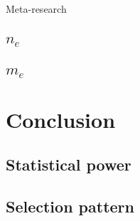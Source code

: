 \documentclass[]{book}
\begin{document}
Meta-research

\hypertarget{n_e}{%
\section{\texorpdfstring{\(n_e\)}{n\_e}}\label{n_e}}

\hypertarget{m_e}{%
\section{\texorpdfstring{\(m_e\)}{m\_e}}\label{m_e}}

\hypertarget{conclusion}{%
\chapter{Conclusion}\label{conclusion}}

\hypertarget{statistical-power}{%
\section{Statistical power}\label{statistical-power}}

\hypertarget{selection-pattern}{%
\section{Selection pattern}\label{selection-pattern}}


\end{document}

